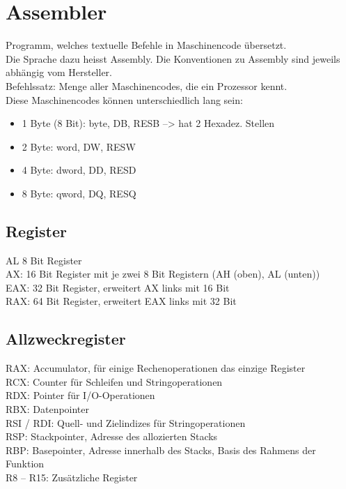 \section{Assembler}
Programm, welches textuelle Befehle in Maschinencode übersetzt. \\
Die Sprache dazu heisst Assembly. Die Konventionen zu Assembly sind jeweils abhängig vom Hersteller.\\

\textcolor{myblue}{Befehlssatz:} Menge aller Maschinencodes, die ein Prozessor kennt.\\

Diese Maschinencodes können unterschiedlich lang sein:
\begin{itemize}
  \item 1 Byte (8 Bit): byte, DB, RESB --> hat 2 Hexadez. Stellen
  \item 2 Byte: word, DW, RESW
  \item 4 Byte: dword, DD, RESD
  \item 8 Byte: qword, DQ, RESQ
\end{itemize}

\subsection{Register}
\textcolor{myblue}{AL} 8 Bit Register\\
\textcolor{myblue}{AX}: 16 Bit Register mit je zwei 8 Bit Registern (AH (oben), AL (unten))\\
\textcolor{myblue}{EAX}: 32 Bit Register, erweitert AX links mit 16 Bit\\
\textcolor{myblue}{RAX}: 64 Bit Register, erweitert EAX links mit 32 Bit\\

\subsection{Allzweckregister}
\textcolor{myblue}{RAX}: Accumulator, für einige Rechenoperationen das einzige Register\\
\textcolor{myblue}{RCX}: Counter für Schleifen und Stringoperationen\\
\textcolor{myblue}{RDX}: Pointer für I/O-Operationen\\
\textcolor{myblue}{RBX}: Datenpointer\\
\textcolor{myblue}{RSI / RDI}: Quell- und Zielindizes für Stringoperationen\\
\textcolor{myblue}{RSP}: Stackpointer, Adresse des allozierten Stacks\\
\textcolor{myblue}{RBP}: Basepointer, Adresse innerhalb des Stacks, Basis des Rahmens der Funktion\\
\textcolor{myblue}{R8 – R15}: Zusätzliche Register\\
